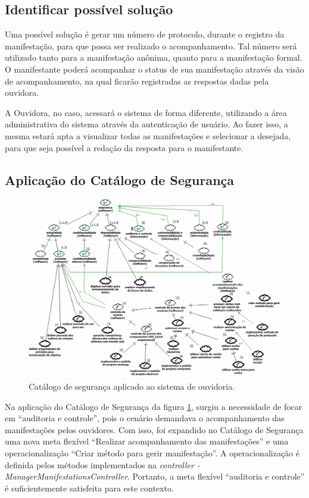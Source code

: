\subsection{Identificar possível solução}

Uma possível solução é gerar um número de protocolo, durante o registro da manifestação, para que possa ser realizado o acompanhamento. Tal número será utilizado tanto para a manifestação anônima, quanto para a manifestação formal. O manifestante poderá acompanhar o status de sua manifestação através da visão de acompanhamento, na qual ficarão registradas as respostas dadas pela ouvidora.

A Ouvidora, no caso, acessará o sistema de forma diferente, utilizando a área administrativa do sistema através da autenticação de usuário. Ao fazer isso, a mesma estará apta a visualizar todas as manifestações e selecionar a desejada, para que seja possível a redação da resposta para o manifestante.  

\subsection{Aplicação do Catálogo de Segurança}

\begin{figure}[h!]
	\centering
	\includegraphics[keepaspectratio=true,scale=0.6]{figuras/catalogoPersona2.PNG}
	\caption{Catálogo de segurança aplicado ao sistema de ouvidoria.}
	\label{catalogoPersona2}
\end{figure}



Na aplicação do Catálogo de Segurança da figura \ref{catalogoPersona2}, surgiu a necessidade de focar em  “auditoria e controle”, pois o cenário demandava  o acompanhamento das manifestações pelos ouvidores. Com isso, foi expandido no Catálogo de Segurança uma nova meta flexível “Realizar acompanhamento das manifestações” e uma operacionalização “Criar método para gerir manifestação”. A operacionalização é definida pelos métodos implementados na \textit{controller - ManagerManifestationsController}. Portanto, a meta flexível “auditoria e controle” é suficientemente satisfeita para este contexto.

